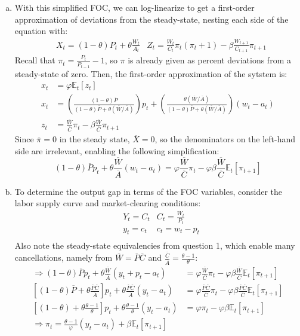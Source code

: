 \documentclass{article}
\newcommand{\Et}[1]{\mathbb{E}_t\left[#1\right]}
\begin{document}
\begin{enumerate}[(a)]
	\item With this simplified FOC, we can log-linearize to get a first-order approximation of deviations from the steady-state, nesting each side of the equation with:
		\begin{align*}
			&X_t = (1-\theta)P_t + \theta\frac{W_t}{A_t}	&Z_t = \frac{W_t}{C_t}\pi_t(\pi_t+1)-\beta\frac{W_{t+1}}{C_{t+1}}\pi_{t+1}
		\end{align*}
		Recall that ${\pi_t=\frac{P_t}{P_{t-1}}-1}$, so $\pi$ is already given as percent deviations from a steady-state of zero. Then, the first-order approximation of the sytstem is:
		\begin{align*}
			x_t	&= \varphi\Et{z_t}																								\\
			x_t &= \left(\frac{(1-\theta)\overline{P}}{(1-\theta)\overline{P}+\theta(\overline{W}/\overline{A})}\right)p_t +
					\left(\frac{\theta(\overline{W}/\overline{A})}{(1-\theta)\overline{P}+\theta(\overline{W}/\overline{A})}\right)(w_t-a_t)	\\
			z_t &= \frac{\overline{W}}{\overline{C}}\pi_t- \beta\frac{\overline{W}}{\overline{C}}\pi_{t+1}					
		\end{align*}
		Since ${\overline{\pi}=0}$ in the steady state, ${\overline{X}=0}$, so the denominators on the left-hand side are irrelevant, enabling the following simplification:
		\[
			(1-\theta)\overline{P}p_t + \theta\frac{\overline{W}}{\overline{A}}(w_t-a_t) 
					= \varphi\frac{\overline{W}}{\overline{C}}\pi_t- \varphi\beta\frac{\overline{W}}{\overline{C}}\Et{\pi_{t+1}}
		\]
		
	\item To determine the output gap in terms of the FOC variables, consider the labor supply curve and market-clearing conditions:
		\begin{align*}
			&Y_t = C_t 	&C_t = \frac{W_t}{P_t}	\\
			&y_t = c_t 	&c_t = w_t - p_t		\\
		\end{align*}
		Also note the steady-state equivalencies from question 1, which enable many cancellations, namely from ${\overline{W}=\overline{P}\overline{C}}$ and ${\frac{\overline{C}}{\overline{A}} = \frac{\theta-1}{\theta}}$:
		\begin{align*}
			\Rightarrow (1-\theta)\overline{P}p_t + \theta\frac{\overline{W}}{\overline{A}}(y_t+p_t-a_t) 
					&= \varphi\frac{\overline{W}}{\overline{C}}\pi_t- \varphi\beta\frac{\overline{W}}{\overline{C}}\Et{\pi_{t+1}}	\\
			\left[(1-\theta)\overline{P} + \theta\frac{\overline{P}\overline{C}}{\overline{A}}\right]p_t + 
				\theta\frac{\overline{P}\overline{C}}{\overline{A}}(y_t-a_t) 
				&= \varphi\frac{\overline{P}\overline{C}}{\overline{C}}\pi_t- \varphi\beta\frac{\overline{P}\overline{C}}{\overline{C}}\Et{\pi_{t+1}}	\\
			\left[(1-\theta) + \theta\frac{\theta-1}{\theta}\right]p_t + 
				\theta\frac{\theta-1}{\theta}(y_t-a_t)  &= \varphi\pi_t- \varphi\beta\Et{\pi_{t+1}}	\\
			\Rightarrow \pi_t = \frac{\theta-1}{\varphi}(y_t-a_t) + \beta\Et{\pi_{t+1}}
		\end{align*}
	

\end{enumerate}
\end{document}
